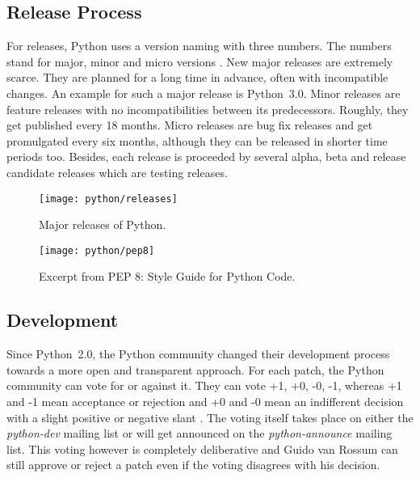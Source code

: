 
\subsection{Release Process} %

For releases, Python uses a version naming with three numbers. The numbers
stand for major, minor and micro versions
\cite{PythonDevelopmentCycle,Warsaw2001}. New major releases are extremely
scarce. They are planned for a long time in advance, often with incompatible
changes. An example for such a major release is Python~3.0. Minor releases are
feature releases with no incompatibilities between its predecessors. Roughly,
they get published every 18 months. Micro releases are bug fix releases and get
promulgated every six months, although they can be released in shorter time
periods too. Besides, each release is proceeded by several alpha, beta and
release candidate releases which are testing releases.

\vfill
\begin{figure}[bhtp]
  \centering
  \texttt{[image: python/releases]}
  \caption[Major Releases of Python]{Major releases of Python.}
\end{figure}

\begin{figure}[htbp]
  \centering
  \texttt{[image: python/pep8]}
  \caption[Excerpt from \acl{PEP} 8]{Excerpt from \ac{PEP} 8: Style Guide for Python Code.}
\end{figure}


\subsection{Development} %

Since Python~2.0, the Python community changed their development process
towards a more open and transparent approach. For each patch, the Python
community can vote for or against it. They can vote +1, +0, -0, -1, whereas +1
and -1 mean acceptance or rejection and +0 and -0 mean an indifferent decision
with a slight positive or negative slant \cite{Warsaw2002}. The voting itself
takes place on either the \emph{python-dev} mailing list or will get announced
on the \emph{python-announce} mailing list. This voting however is completely
deliberative and Guido van Rossum can still approve or reject a patch even if
the voting disagrees with his decision.

